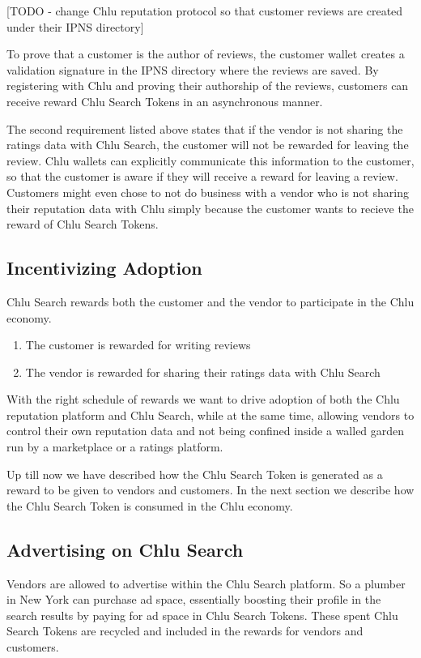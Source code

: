 \documentclass[a4paper]{article}
\begin{document}
[TODO - change Chlu reputation protocol so that customer reviews are
  created under their IPNS directory]

To prove that a customer is the author of reviews, the customer wallet
creates a validation signature in the IPNS directory where the reviews
are saved. By registering with Chlu and proving their authorship of
the reviews, customers can receive reward Chlu Search Tokens in an
asynchronous manner.

The second requirement listed above states that if the vendor is not
sharing the ratings data with Chlu Search, the customer will not be
rewarded for leaving the review. Chlu wallets can explicitly
communicate this information to the customer, so that the customer is
aware if they will receive a reward for leaving a review. Customers
might even chose to not do business with a vendor who is not sharing
their reputation data with Chlu simply because the customer wants to
recieve the reward of Chlu Search Tokens.

\subsection{Incentivizing Adoption}

Chlu Search rewards both the customer and the vendor to participate in
the Chlu economy.

\begin{enumerate}
\item The customer is rewarded for writing reviews
\item The vendor is rewarded for sharing their ratings data with Chlu
  Search
\end{enumerate}

With the right schedule of rewards we want to drive adoption of both
the Chlu reputation platform and Chlu Search, while at the same time,
allowing vendors to control their own reputation data and not being
confined inside a walled garden run by a marketplace or a ratings
platform.

Up till now we have described how the Chlu Search Token is generated
as a reward to be given to vendors and customers. In the next section
we describe how the Chlu Search Token is consumed in the Chlu economy.

\subsection{Advertising on Chlu Search}

Vendors are allowed to advertise within the Chlu Search platform. So a
plumber in New York can purchase ad space, essentially boosting their
profile in the search results by paying for ad space in Chlu Search
Tokens. These spent Chlu Search Tokens are recycled and included in
the rewards for vendors and customers.
\end{document}
